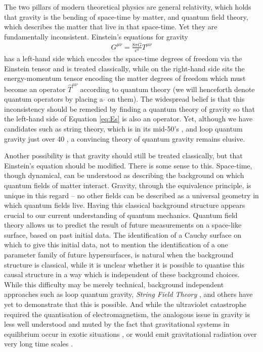 \documentclass[aps,pra,showpacs,citeautoscript,amsmath,amssymb,floatfix,superscriptaddress,bbm, verbatim,amsfonts,changes,11pt,nofootinbib,longbibliography]{revtex4-2}
\begin{document}
The two pillars of modern theoretical physics are general relativity, which holds that gravity is the bending of space-time by matter, and quantum field theory, which describes the matter that live in that space-time. Yet they are fundamentally inconsistent. Einstein's equations for gravity
\begin{align}
G^{\mu\nu}
=\frac{8\pi G}{c^4}{T}^{\mu\nu}
\label{eq:Es}
\end{align}
has a left-hand side which encodes the space-time degrees of freedom via the Einstein tensor and is treated classically, while on the right-hand side sits the energy-momentum tensor encoding the matter degrees of freedom which must become an operator $\hat{T}^{\mu\nu}$ according to quantum theory (we will henceforth denote quantum operators by placing a $\hat{}$ on them)\label{par:hat}.
The widespread belief is that this inconsistency should be remedied by finding a quantum theory of gravity so that the left-hand side of Equation \eqref{eq:Es} is also an operator. Yet, although we have candidates such as string theory, which is in its mid-50's \cite{veneziano1968construction}, and loop quantum gravity just over 40 \cite{sen1982gravity,ashtekar1986new,rovelli1988knot}, a convincing theory of quantum gravity remains elusive.

Another possibility is that gravity should still be treated classically, but that Einstein's  equation should be modified. There is some sense to this. Space-time, though dynamical, can be understood as describing the background on which quantum fields of matter interact. Gravity, through the equivalence principle, is unique in this regard --
no other fields can be described as a universal geometry in which quantum fields live.  
Having this classical background structure appears crucial to our current understanding of quantum mechanics. Quantum field theory allows us to predict the result of future measurements on a space-like surface, based on past initial data. The identification of a Cauchy surface on which to give this initial data, not to mention the identification of a one parameter family of future hypersurfaces, is natural when the background structure is classical, while it is unclear whether it is possible to quantise this causal structure in a way which is independent of these background choices. While this difficulty may be merely technical, background independent approaches such as loop quantum gravity, {\it String Field Theory} \cite{PhysRevD.46.5467}, and others \cite{hardy2005probability,oreshkov2012quantum} have yet to demonstrate that this is possible.
And while the ultraviolet 
catastrophe required the quantisation of electromagnetism, the analogous issue in gravity is less well understood \cite{smolin1984thermodynamics} and muted by the fact that gravitational systems in equilibrium occur in exotic situations \cite{hawking1983thermodynamics}, or would emit gravitational radiation over very long time scales \cite{Simidzija_2021}. \label{par:uv}
\end{document}
